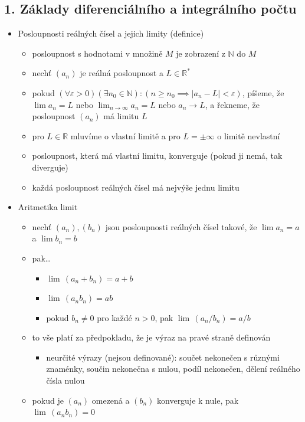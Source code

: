 \subsection{1. Základy diferenciálního a integrálního počtu}
\begin{itemize}
\item Posloupnosti reálných čísel a jejich limity (definice)
\begin{itemize}
\item posloupnost s hodnotami v množině $M$ je zobrazení z $\mathbb N$ do $M$
\item nechť $(a_n)$ je reálná posloupnost a $L \in \mathbb R^*$
\item pokud $(\forall\varepsilon\gt 0)(\exists n_0\in\mathbb N):(n\geq n_0\implies |a_n-L|\lt\varepsilon)$, píšeme, že $\lim a_n=L$ nebo $\lim_{n\to\infty}a_n=L$ nebo $a_n\to L$, a řekneme, že posloupnost $(a_n)$ má limitu $L$
\item pro $L\in \mathbb R$ mluvíme o vlastní limitě a pro $L=\pm\infty$ o limitě nevlastní
\item posloupnost, která má vlastní limitu, konverguje (pokud ji nemá, tak diverguje)
\item každá posloupnost reálných čísel má nejvýše jednu limitu
\end{itemize}
\item Aritmetika limit
\begin{itemize}
\item nechť $(a_n),(b_n)$ jsou posloupnosti reálných čísel takové, že $\lim a_n=a$ a $\lim b_n=b$
\item pak\dots{}
\begin{itemize}
\item $\lim\,(a_n+b_n)=a+b$
\item $\lim\,(a_nb_n)=ab$
\item pokud $b_n\neq 0$ pro každé $n\gt 0$, pak $\lim\,(a_n/b_n)=a/b$
\end{itemize}
\item to vše platí za předpokladu, že je výraz na pravé straně definován
\begin{itemize}
\item neurčité výrazy (nejsou definované): součet nekonečen s různými znaménky, součin nekonečna s nulou, podíl nekonečen, dělení reálného čísla nulou
\end{itemize}
\item pokud je $(a_n)$ omezená a $(b_n)$ konverguje k nule, pak $\lim\,(a_nb_n)=0$
\begin{itemize}

\end{itemize}
\end{itemize}
\end{itemize}
